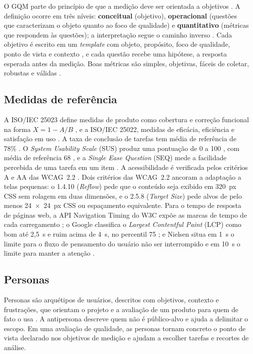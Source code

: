 O GQM parte do princípio de que a medição deve ser orientada a objetivos \cite{basili1994}. A definição ocorre em três níveis: \textbf{conceitual} (objetivo), \textbf{operacional} (questões que caracterizam o objeto quanto ao foco de qualidade) e \textbf{quantitativo} (métricas que respondem às questões); a interpretação segue o caminho inverso \cite{ramos2026gqm}. Cada objetivo é escrito em um \textit{template} com objeto, propósito, foco de qualidade, ponto de vista e contexto \cite{basili1994}, e cada questão recebe uma hipótese, a resposta esperada antes da medição. Boas métricas são simples, objetivas, fáceis de coletar, robustas e válidas \cite{ramos2026gqm}.

\subsection{Medidas de referência}
\label{sec:medidas-referencia}

A ISO/IEC 25023 define medidas de produto como cobertura e correção funcional na forma $X = 1 - A/B$ \cite{iso25023}, e a ISO/IEC 25022, medidas de eficácia, eficiência e satisfação em uso \cite{iso25022}. A taxa de conclusão de tarefas tem média de referência de 78\% \cite{sauro2011}. O \textit{System Usability Scale} (SUS) produz uma pontuação de 0 a 100 \cite{brooke1996}, com média de referência 68 \cite{sauro2016}, e a \textit{Single Ease Question} (SEQ) mede a facilidade percebida de uma tarefa em um item \cite{sauro2016}. A acessibilidade é verificada pelos critérios A e AA das WCAG~2.2 \cite{wcag22}. Dois critérios das WCAG~2.2 ancoram a adaptação a telas pequenas: o 1.4.10 (\textit{Reflow}) pede que o conteúdo seja exibido em 320~px CSS sem rolagem em duas dimensões, e o 2.5.8 (\textit{Target Size}) pede alvos de pelo menos 24~$\times$~24~px CSS ou espaçamento equivalente. Para o tempo de resposta de páginas web, a API Navigation Timing do W3C expõe as marcas de tempo de cada carregamento \cite{navtiming}; o Google classifica o \textit{Largest Contentful Paint} (LCP) como bom até 2,5~s e ruim acima de 4~s, no percentil 75 \cite{webvitals}; e Nielsen situa em 1~s o limite para o fluxo de pensamento do usuário não ser interrompido e em 10~s o limite para manter a atenção \cite{nielsen1993}.

\subsection{Personas}
\label{sec:personas-ref}

Personas são arquétipos de usuários, descritos com objetivos, contexto e frustrações, que orientam o projeto e a avaliação de um produto para quem de fato o usa \cite{cooper1999}. A antipersona descreve quem não é público-alvo e ajuda a delimitar o escopo. Em uma avaliação de qualidade, as personas tornam concreto o ponto de vista declarado nos objetivos de medição e ajudam a escolher tarefas e recortes de análise.
